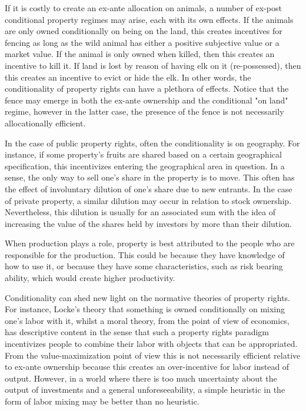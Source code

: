If it is costly to create an ex-ante allocation on animals, a number of ex-post conditional property regimes may arise, each with its own effects. If the animals are only owned conditionally on being on the land, this creates incentives for fencing as long as the wild animal has either a positive subjective value or a market value. If the animal is only owned when killed, then this creates an incentive to kill it. If land is lost by reason of having elk on it (re-possessed), then this creates an incentive to evict or hide the elk. In other words, the conditionality of property rights can have a plethora of effects. Notice that the fence may emerge in both the ex-ante ownership and the conditional "on land" regime, however in the latter case, the presence of the fence is not necessarily allocationally efficient. 


In the case of public property rights, often the conditionality is on geography. For instance, if some property's fruits are shared based on a certain geographical specification, this incentivizes entering the geographical area in question. In a sense, the only way to sell one's share in the property is to move. This often has the effect of involuntary dilution of one's share due to new entrants. In the case of private property, a similar dilution may occur in relation to stock ownership. Nevertheless, this dilution is usually for an associated sum with the idea of increasing the value of the shares held by investors by more than their dilution.

When production plays a role, property is best attributed to the people who are responsible for the production. This could be because they have knowledge of how to use it, or because they have some characteristics, such as risk bearing ability, which would create higher productivity.

Conditionality can shed new light on the normative theories of property rights. For instance, Locke's theory that something is owned conditionally on mixing one's labor with it, whilst a moral theory, from the point of view of economics, has descriptive content in the sense that such a property rights paradigm incentivizes people to combine their labor with objects that can be appropriated. From the value-maximization point of view this is not necessarily efficient relative to ex-ante ownership because this creates an over-incentive for labor instead of output. However, in a world where there is too much uncertainty about the output of investments and a general unforeseeability, a simple heuristic in the form of labor mixing may be better than no heuristic. 

